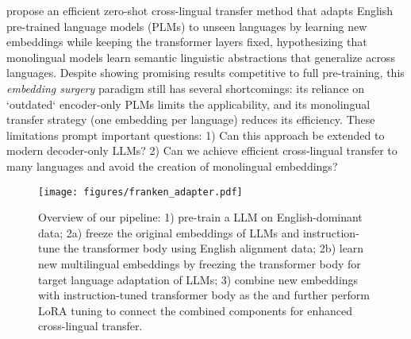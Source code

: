 \citet{artetxe-etal-2020-cross} propose an efficient zero-shot cross-lingual transfer method that adapts English pre-trained language models (PLMs) to unseen languages by learning new embeddings while keeping the transformer layers fixed, hypothesizing that monolingual models learn semantic linguistic abstractions
that generalize across languages. Despite showing promising results competitive to full pre-training, this \emph{embedding surgery} paradigm still has several shortcomings: its reliance on `outdated` encoder-only PLMs limits the applicability, and its monolingual transfer strategy (\ie one embedding per language) reduces its efficiency. These limitations prompt important questions: 1) Can this approach be extended to modern decoder-only LLMs? 2) Can we achieve efficient cross-lingual transfer to many languages and avoid the creation of monolingual embeddings?

\begin{figure*}
    \setlength{\abovecaptionskip}{-0.0001cm}
    \setlength{\belowcaptionskip}{-0.35cm}
    \centering
    \texttt{[image: figures/franken\_adapter.pdf]}
    \vspace{-4mm}
    \caption{Overview of our \ouradapter pipeline: 1) pre-train a LLM on English-dominant data; 2a) freeze the original embeddings of LLMs and instruction-tune the transformer body using English alignment data; 2b) learn new multilingual embeddings by freezing the transformer body for target language adaptation of LLMs; 3) combine new embeddings with instruction-tuned transformer body as the \emph{\ouradapter} and further perform LoRA tuning to connect the combined components for enhanced cross-lingual transfer.}
    \vspace{-5mm}
    \label{fig:franken_adapter}
\end{figure*}


